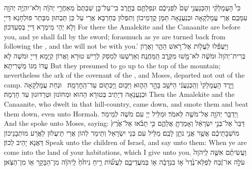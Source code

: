 {כִּי֩ הָעֲמָלֵקִ֨י וְהַכְּנַעֲנִ֥י שָׁם֙ לִפְנֵיכֶ֔ם וּנְפַלְתֶּ֖ם בֶּחָ֑רֶב כִּֽי־עַל־כֵּ֤ן שַׁבְתֶּם֙ מֵאַחֲרֵ֣י יְהֹוָ֔ה וְלֹא־יִהְיֶ֥ה יְהֹוָ֖ה עִמָּכֶֽם׃
}
{אֲרֵי עֲמָלְקָאָה וּכְנַעֲנָאָה תַּמָּן קֳדָמֵיכוֹן וְתִפְּלוּן בְּחַרְבָּא אֲרֵי עַל כֵּן תַּבְתּוּן מִבָּתַר פּוּלְחָנָא דַּייָ וְלָא יְהֵי מֵימְרָא דַּייָ בְּסַעְדְּכוֹן׃}
{For there the Amalekite and the Canaanite are before you, and ye shall fall by the sword; forasmuch as ye are turned back from following the \lord, and the \lord\space will not be with you.’}{}
{וַיַּעְפִּ֕לוּ לַעֲל֖וֹת אֶל־רֹ֣אשׁ הָהָ֑ר וַאֲר֤וֹן בְּרִית־יְהֹוָה֙ וּמֹשֶׁ֔ה לֹא־מָ֖שׁוּ מִקֶּ֥רֶב הַֽמַּחֲנֶֽה׃
}
{וְאַרְשַׁעוּ לְמִסַּק לְרֵישׁ טוּרָא וַאֲרוֹן קְיָמָא דַּייָ וּמֹשֶׁה לָא עֲדוֹ מִגּוֹ מַשְׁרִיתָא׃}
{But they presumed to go up to the top of the mountain; nevertheless the ark of the covenant of the \lord, and Moses, departed not out of the camp.}{}
{וַיֵּ֤רֶד הָעֲמָלֵקִי֙ וְהַֽכְּנַעֲנִ֔י הַיֹּשֵׁ֖ב בָּהָ֣ר הַה֑וּא וַיַּכּ֥וּם וַֽיַּכְּת֖וּם עַד־הַֽחׇרְמָֽה׃ \petucha 
{}}
{וּנְחַת עֲמָלְקָאָה וּכְנַעֲנָאָה דְּיָתֵיב בְּטוּרָא הַהוּא וּמְחוֹנוּן וּטְרַדוּנוּן עַד חָרְמָה׃}
{Then the Amalekite and the Canaanite, who dwelt in that hill-country, came down, and smote them and beat them down, even unto Hormah.}{}
\newperek
{}%
{וַיְדַבֵּ֥ר יְהֹוָ֖ה אֶל־מֹשֶׁ֥ה לֵּאמֹֽר׃}
{וּמַלֵּיל יְיָ עִם מֹשֶׁה לְמֵימַר׃}
{And the \lord\space spoke unto Moses, saying:}{}
{דַּבֵּר֙ אֶל־בְּנֵ֣י יִשְׂרָאֵ֔ל וְאָמַרְתָּ֖ אֲלֵהֶ֑ם כִּ֣י תָבֹ֗אוּ אֶל־אֶ֙רֶץ֙ מוֹשְׁבֹ֣תֵיכֶ֔ם אֲשֶׁ֥ר אֲנִ֖י נֹתֵ֥ן לָכֶֽם׃
}
{מַלֵּיל עִם בְּנֵי יִשְׂרָאֵל וְתֵימַר לְהוֹן אֲרֵי תֵיעֲלוּן לַאֲרַע מוֹתְבָנֵיכוֹן דַּאֲנָא יָהֵיב לְכוֹן׃}
{Speak unto the children of Israel, and say unto them: When ye are come into the land of your habitations, which I give unto you,}{}
{וַעֲשִׂיתֶ֨ם אִשֶּׁ֤ה לַֽיהֹוָה֙ עֹלָ֣ה אוֹ־זֶ֔בַח לְפַלֵּא־נֶ֙דֶר֙ א֣וֹ בִנְדָבָ֔ה א֖וֹ בְּמֹעֲדֵיכֶ֑ם לַעֲשׂ֞וֹת רֵ֤יחַ נִיחֹ֙חַ֙ לַֽיהֹוָ֔ה מִן־הַבָּקָ֖ר א֥וֹ מִן־הַצֹּֽאן׃
}
